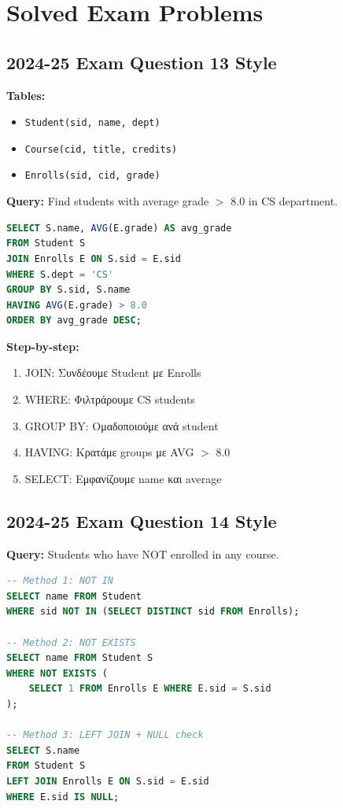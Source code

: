\section{Solved Exam Problems}

\subsection{2024-25 Exam Question 13 Style}

\begin{examplebox}
\textbf{Tables:}
\begin{itemize}
    \item \texttt{Student(sid, name, dept)}
    \item \texttt{Course(cid, title, credits)}
    \item \texttt{Enrolls(sid, cid, grade)}
\end{itemize}

\textbf{Query:} Find students with average grade $>$ 8.0 in CS department.

\begin{lstlisting}[language=SQL]
SELECT S.name, AVG(E.grade) AS avg_grade
FROM Student S
JOIN Enrolls E ON S.sid = E.sid
WHERE S.dept = 'CS'
GROUP BY S.sid, S.name
HAVING AVG(E.grade) > 8.0
ORDER BY avg_grade DESC;
\end{lstlisting}

\textbf{Step-by-step:}
\begin{enumerate}
    \item JOIN: Συνδέουμε Student με Enrolls
    \item WHERE: Φιλτράρουμε CS students
    \item GROUP BY: Ομαδοποιούμε ανά student
    \item HAVING: Κρατάμε groups με AVG $>$ 8.0
    \item SELECT: Εμφανίζουμε name και average
\end{enumerate}
\end{examplebox}

\subsection{2024-25 Exam Question 14 Style}

\begin{examplebox}
\textbf{Query:} Students who have NOT enrolled in any course.

\begin{lstlisting}[language=SQL]
-- Method 1: NOT IN
SELECT name FROM Student
WHERE sid NOT IN (SELECT DISTINCT sid FROM Enrolls);

-- Method 2: NOT EXISTS
SELECT name FROM Student S
WHERE NOT EXISTS (
    SELECT 1 FROM Enrolls E WHERE E.sid = S.sid
);

-- Method 3: LEFT JOIN + NULL check
SELECT S.name
FROM Student S
LEFT JOIN Enrolls E ON S.sid = E.sid
WHERE E.sid IS NULL;
\end{lstlisting}
\end{examplebox}


